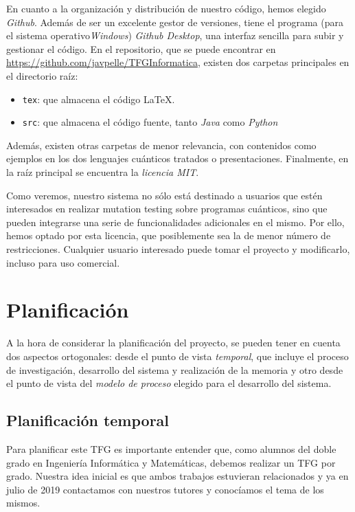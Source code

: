 En cuanto a la organización y distribución de nuestro código, hemos elegido \textit{Github}. Además de ser un excelente gestor de versiones, tiene el programa (para el sistema operativo\textit{Windows}) \textit{Github Desktop}, una interfaz sencilla para subir y gestionar el código. En el repositorio, que se puede encontrar en \url{https://github.com/javpelle/TFGInformatica}, existen dos carpetas principales en el directorio raíz:

\begin{itemize}
\item \texttt{tex}: que almacena el código \LaTeX.
\item \texttt{src}: que almacena el código fuente, tanto \textit{Java} como \textit{Python}
\end{itemize}

Además, existen otras carpetas de menor relevancia, con contenidos como ejemplos en los dos lenguajes cuánticos tratados o presentaciones. Finalmente, en la raíz principal se encuentra la \textit{licencia MIT}.

Como veremos, nuestro sistema no sólo está destinado a usuarios que estén interesados en realizar mutation testing sobre programas cuánticos, sino que pueden integrarse una serie de funcionalidades adicionales en el mismo. Por ello, hemos optado por esta licencia, que posiblemente sea la de menor número de restricciones. Cualquier usuario interesado puede tomar el proyecto y modificarlo, incluso para uso comercial.

\section{Planificación}

A la hora de considerar la planificación del proyecto, se pueden tener en cuenta dos aspectos ortogonales: desde el punto de vista {\it temporal}, que incluye el proceso de investigación, desarrollo del sistema y realización de la memoria y otro desde el punto de vista del {\it modelo de proceso} elegido para el desarrollo del sistema.

\subsection{Planificación temporal}

Para planificar este TFG es importante entender que, como alumnos del doble grado en Ingeniería Informática y Matemáticas, debemos realizar un TFG por grado. Nuestra idea inicial es que ambos trabajos estuvieran relacionados y ya en julio de 2019 contactamos con nuestros tutores y conocíamos el tema de los mismos.

